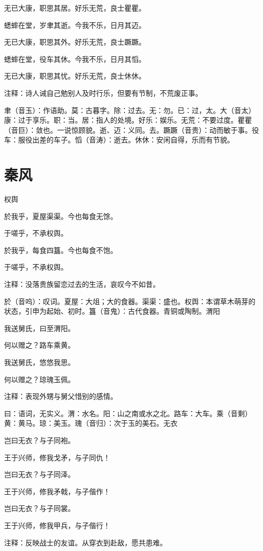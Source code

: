 \documentclass[12pt,UTF8]{ctexbook}
\begin{document}
无已大康，职思其居。好乐无荒，良士瞿瞿。

蟋蟀在堂，岁聿其逝。今我不乐，日月其迈。

无已大康，职思其外。好乐无荒，良士蹶蹶。

蟋蟀在堂，役车其休。今我不乐，日月其慆。

无已大康，职思其忧。好乐无荒，良士休休。

注释：诗人诫自己勉别人及时行乐，但要有节制，不荒废正事。

聿（音玉）：作语助。莫：古暮字。除：过去。无：勿。已：过，太。大（音太）康：过于享乐。职：当。居：指人的处境。好乐：娱乐。无荒：不要过度。瞿瞿（音巨）：敛也。一说惊顾貌。逝、迈：义同。去。蹶蹶（音贵）：动而敏于事。役车：服役出差的车子。慆（音涛）：逝去。休休：安闲自得，乐而有节貌。



\part{秦风}

权舆

於我乎，夏屋渠渠。今也每食无馀。

于嗟乎，不承权舆。

於我乎，每食四簋。今也每食不饱。

于嗟乎，不承权舆。

注释：没落贵族留恋过去的生活，哀叹今不如昔。

於（音呜）：叹词。夏屋：大俎；大的食器。渠渠：盛也。权舆：本谓草木萌芽的状态，引申为起始、初时。簋（音鬼）：古代食器。青铜或陶制。渭阳

我送舅氏，曰至渭阳。

何以赠之？路车乘黄。

我送舅氏，悠悠我思。

何以赠之？琼瑰玉佩。

注释：表现外甥与舅父惜别的感情。

曰：语词，无实义。渭：水名。阳：山之南或水之北。路车：大车。乘（音剩）黄：黄马。琼：美玉。瑰（音归）：次于玉的美石。无衣

岂曰无衣？与子同袍。

王于兴师，修我戈矛，与子同仇！

岂曰无衣？与子同泽。

王于兴师，修我矛戟，与子偕作！

岂曰无衣？与子同裳。

王于兴师，修我甲兵，与子偕行！

注释：反映战士的友谊。从穿衣到赴敌，愿共患难。
\end{document}
